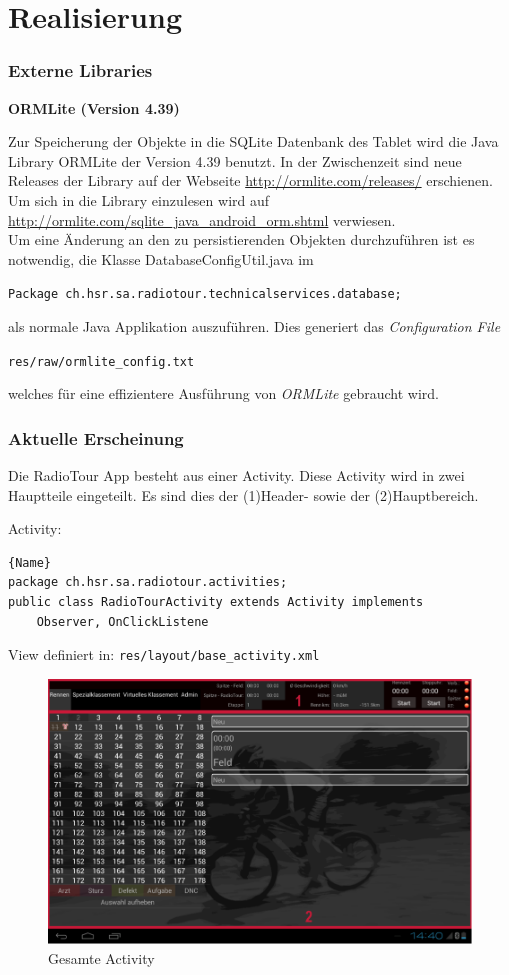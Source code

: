 \chapter{Realisierung}
\label{ref:realisierung}
\subsection{Externe Libraries}
\textbf{ORMLite (Version 4.39)}

Zur Speicherung der Objekte in die SQLite Datenbank des Tablet wird die Java Library ORMLite der Version 4.39 benutzt. In der Zwischenzeit sind neue Releases der Library auf der Webseite \url{http://ormlite.com/releases/} erschienen. Um sich in die Library einzulesen wird auf \url{http://ormlite.com/sqlite_java_android_orm.shtml} verwiesen.
\\
Um eine Änderung an den zu persistierenden Objekten durchzuführen ist es notwendig, die Klasse DatabaseConfigUtil.java im

\lstinline|Package ch.hsr.sa.radiotour.technicalservices.database;|

als normale Java Applikation auszuführen. Dies generiert das \textit{Configuration File}

\lstinline|res/raw/ormlite_config.txt|

welches für eine effizientere Ausführung von \textit{ORMLite} gebraucht wird.

\subsection{Aktuelle Erscheinung}
Die RadioTour App besteht aus einer Activity. Diese Activity wird in zwei Hauptteile eingeteilt. Es sind dies der (1)Header- sowie der (2)Hauptbereich. 

Activity:
\begin{lstlisting}{Name}
package ch.hsr.sa.radiotour.activities;
public class RadioTourActivity extends Activity implements
	Observer, OnClickListene
\end{lstlisting}


View definiert in:
\lstinline|res/layout/base_activity.xml|

\begin{figure}[h!]
\caption{Gesamte Activity}
\centering
\includegraphics[scale=0.9]{07anhang/images/dev_activity.png}
\end{figure}


